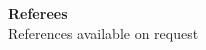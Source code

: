 \documentclass[a4paper,12pt,final,sans]{memoir}
\begin{document}

\textbf{\textsf{\color{head} \large{Referees} }}\\[-0.9em]

References available on request


\end{document}
